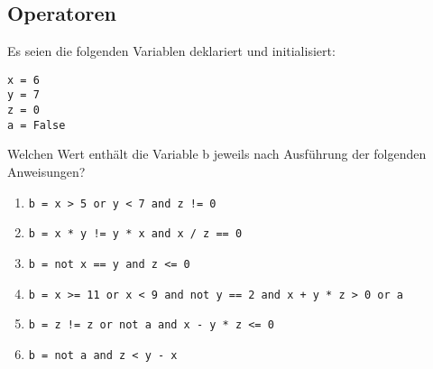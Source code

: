 \subsection{Operatoren}
Es seien die folgenden Variablen deklariert und initialisiert:
\begin{lstlisting}
x = 6
y = 7
z = 0
a = False
\end{lstlisting}
Welchen Wert enthält die Variable b jeweils nach Ausführung der folgenden Anweisungen?
\begin{enumerate}
    \item \lstinline{b = x > 5 or y < 7 and z != 0}
    \item \lstinline{b = x * y != y * x and x / z == 0}
    \item \lstinline{b = not x == y and z <= 0}
    \item \lstinline{b = x >= 11 or x < 9 and not y == 2 and x + y * z > 0 or a}
    \item \lstinline{b = z != z or not a and x - y * z <= 0}
    \item \lstinline{b = not a and z < y - x}
\end{enumerate}
